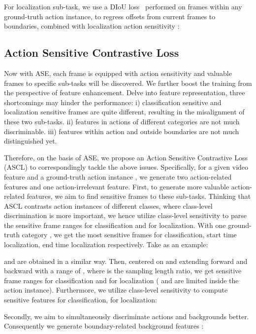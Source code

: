 \documentclass[10pt,twocolumn,letterpaper]{article}
\begin{document}
For localization sub-task, we use a DIoU loss~\cite{zheng2020diou} performed on frames within any ground-truth action instance, to regress offsets from current frames to boundaries, combined with localization action sensitivity :



\subsection{Action Sensitive Contrastive Loss}
\label{sec:ascl} 
\par Now with ASE, each frame is equipped with action sensitivity and valuable frames to specific sub-tasks will be discovered. We further boost the training from the perspective of feature enhancement. 
Delve into feature representation, three shortcomings may hinder the performance: 
i) classification sensitive and localization sensitive frames are quite different, resulting in the misalignment of these two sub-tasks.  
ii) features in actions of different categories are not much discriminable.
iii) features within action and outside boundaries are not much distinguished yet.
\par Therefore, on the basis of ASE, we propose an Action Sensitive Contrastive Loss (ASCL) to correspondingly tackle the above issues.
Specifically, for a given video feature  and a ground-truth action instance , 
we generate two action-related features and one action-irrelevant feature. 
First, to generate more valuable action-related features, we aim to find sensitive frames to these sub-tasks. Thinking that ASCL contrasts action instances of different classes, where class-level discrimination is more important, we hence utilize class-level sensitivity  to parse the sensitive frame ranges  for classification and  for localization.
With one ground-truth category , we get the most sensitive frames  for classification, start time localization, end time localization respectively. Take  as an example:

 and  are obtained in a similar way. Then, centered on  and extending forward and backward with a range of , where  is the sampling length ratio, we get sensitive frame ranges  for classification and  for localization ( and  are limited inside the action instance).
Furthermore,  we utilize class-level sensitivity to compute sensitive features  for classification,  for localization:

\par Secondly, we aim to simultaneously discriminate actions and backgrounds better. Consequently we generate boundary-related background features :
\end{document}
